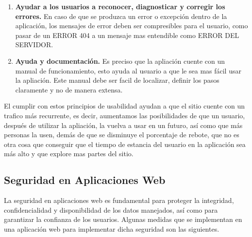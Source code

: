 \begin{enumerate}
	\item \textbf{Ayudar a los usuarios a reconocer, diagnosticar y corregir los errores.} En caso de que se produzca un error o excepción dentro de la aplicación, los mensajes de error deben ser compresibles para el usuario, como pasar de un ERROR 404 a un mensaje mas entendible como ERROR DEL SERVIDOR.
	
	\item \textbf{Ayuda y documentación.} Es preciso que la apliación cuente con un manual de funcionamiento, esto ayuda al usuario a que le sea mas fácil usar la apliación. Este manual debe ser facil de localizar, definir los pasos claramente y no de manera extensa.
\end{enumerate}

El cumplir con estos principios de usabilidad ayudan a que el sitio cuente con un trafico más recurrente, es decir, aumentamos las posibilidades de que un usuario, después de utilizar la apliación, la vuelva a usar en un futuro, así como que más personas la usen, demás de que se disminuye el porcentaje de rebote, que no es otra cosa que conseguir que el tiempo de estancia del usuario en la aplicación sea más alto y que explore mas partes del sitio.


\subsection{Seguridad en Aplicaciones Web}
La seguridad en aplicaciones web es fundamental para proteger la integridad, confidencialidad y disponibilidad de los datos manejados, así como para garantizar la confianza de los usuarios. Algunas medidas que se implementan en una aplicación web para implementar dicha seguridad son las siguientes.

